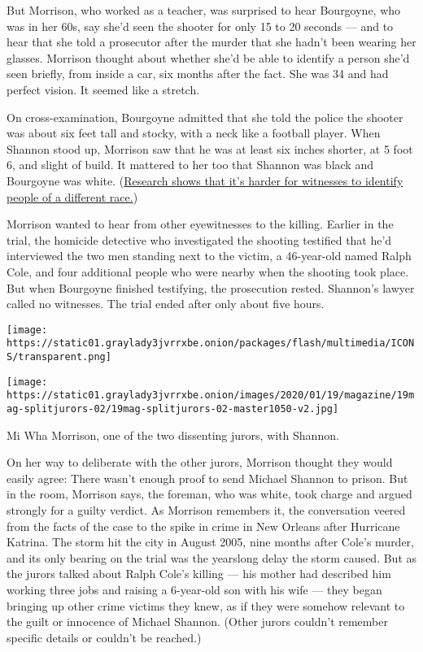 But Morrison, who worked as a teacher, was surprised to hear Bourgoyne,
who was in her 60s, say she'd seen the shooter for only 15 to 20 seconds
--- and to hear that she told a prosecutor after the murder that she
hadn't been wearing her glasses. Morrison thought about whether she'd be
able to identify a person she'd seen briefly, from inside a car, six
months after the fact. She was 34 and had perfect vision. It seemed like
a stretch.

On cross-examination, Bourgoyne admitted that she told the police the
shooter was about six feet tall and stocky, with a neck like a football
player. When Shannon stood up, Morrison saw that he was at least six
inches shorter, at 5 foot 6, and slight of build. It mattered to her too
that Shannon was black and Bourgoyne was white.
(\href{https://www.ncbi.nlm.nih.gov/pmc/articles/PMC3496291/}{Research
shows that it's harder for witnesses to identify people of a different
race.})

Morrison wanted to hear from other eyewitnesses to the killing. Earlier
in the trial, the homicide detective who investigated the shooting
testified that he'd interviewed the two men standing next to the victim,
a 46-year-old named Ralph Cole, and four additional people who were
nearby when the shooting took place. But when Bourgoyne finished
testifying, the prosecution rested. Shannon's lawyer called no
witnesses. The trial ended after only about five hours.

\texttt{[image: https://static01.graylady3jvrrxbe.onion/packages/flash/multimedia/ICONS/transparent.png]}

\texttt{[image: https://static01.graylady3jvrrxbe.onion/images/2020/01/19/magazine/19mag-splitjurors-02/19mag-splitjurors-02-master1050-v2.jpg]}

Mi Wha Morrison, one of the two dissenting jurors, with Shannon.

On her way to deliberate with the other jurors, Morrison thought they
would easily agree: There wasn't enough proof to send Michael Shannon to
prison. But in the room, Morrison says, the foreman, who was white, took
charge and argued strongly for a guilty verdict. As Morrison remembers
it, the conversation veered from the facts of the case to the spike in
crime in New Orleans after Hurricane Katrina. The storm hit the city in
August 2005, nine months after Cole's murder, and its only bearing on
the trial was the yearslong delay the storm caused. But as the jurors
­talked about Ralph Cole's killing --- his mother had described him
working three jobs and raising a 6-year-old son with his wife --- they
began bringing up other crime victims they knew, as if they were somehow
relevant to the guilt or innocence of Michael Shannon. (Other jurors
couldn't remember specific details or couldn't be reached.)

